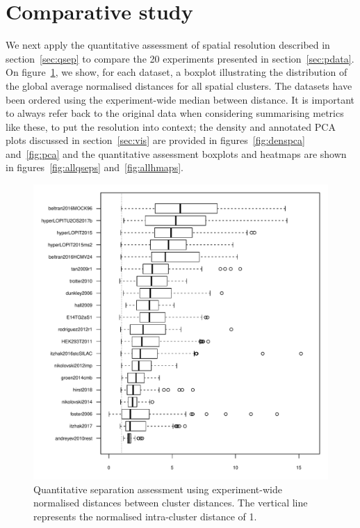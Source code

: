 \documentclass[12pt]{article}\usepackage[]{graphicx}\usepackage[]{color}
\newenvironment{knitrout}{}{} %
\begin{document}
\clearpage

\section{Comparative study}\label{sec:compara}

We next apply the quantitative assessment of spatial resolution
described in section~\ref{sec:qsep} to compare the 20
experiments presented in section~\ref{sec:pdata}. On
figure~\ref{fig:qsep}, we show, for each dataset, a boxplot
illustrating the distribution of the global average normalised
distances for all spatial clusters. The datasets have been ordered
using the experiment-wide median between distance. It is important to
always refer back to the original data when considering
summarising metrics like these, to put the resolution into context;
the density and annotated PCA plots discussed in section~\ref{sec:vis}
are provided in figures~\ref{fig:denspca} and~\ref{fig:pca} and the
quantitative assessment boxplots and heatmaps are shown in
figures~\ref{fig:allqseps} and~\ref{fig:allhmaps}.



\begin{figure}[ht]
  \centering
\begin{knitrout}
\color{fgcolor}
\includegraphics[width=0.65\linewidth]{figure/figqsep-1} 

\end{knitrout}
\caption{Quantitative separation assessment using experiment-wide
  normalised distances between cluster distances. The vertical line
  represents the normalised intra-cluster distance of 1.}
  \label{fig:qsep}
\end{figure}
\end{document}
